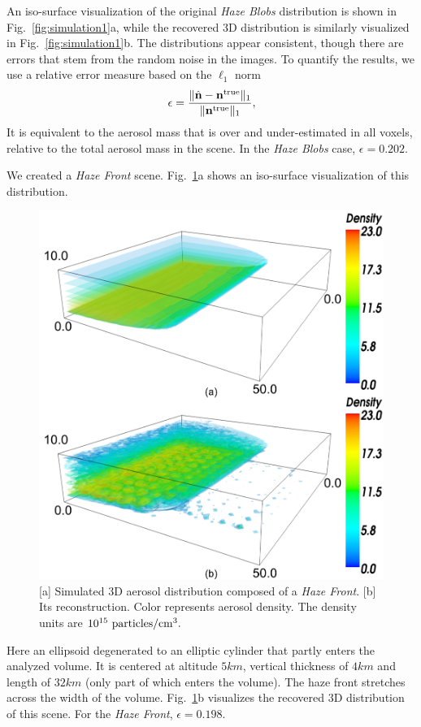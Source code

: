 \documentclass[10pt,twocolumn,letterpaper]{article}
\newcommand{\yoavcomment}[1]{}
\renewcommand{\yoavcomment}[1]{#1} %
\begin{document}
An iso-surface visualization of the original {\em Haze Blobs} distribution is shown in
Fig.~\ref{fig:simulation1}a, while the recovered 3D distribution is similarly visualized in
Fig.~\ref{fig:simulation1}b. The distributions appear consistent, though there are errors that stem from the random noise in the images. To quantify the results, we use a relative  error measure based on the $\ell_1$ norm
\begin{equation}
  \label{eq:ndiff}
  \epsilon=\frac{\| \hat{\bf n}  - {\bf n}^{\rm true} \|_1}
             {\| {\bf n}^{\rm true} \|_1} ,
  \hspace{-0.05cm}
\end{equation}
It is equivalent to the aerosol mass that is over and under-estimated in all voxels, relative to the total aerosol mass in the scene.
In the {\em Haze Blobs} case, $\epsilon=0.202$.

We created a {\em Haze Front} scene. Fig.~\ref{fig:simulation2}a shows an iso-surface visualization of this distribution.
\begin{figure}
  \centering
  \yoavcomment{\includegraphics[width=\columnwidth]{images/simulation2}}
  \caption{\small [a] Simulated 3D aerosol distribution composed of a {\em Haze Front}. [b] Its reconstruction. Color represents aerosol density. The density units are
  $10^{15}~{\rm particles}/{\rm cm}^3.$}
  \label{fig:simulation2}
\end{figure}
Here an ellipsoid degenerated to an elliptic cylinder that partly enters the analyzed volume. It is centered at altitude $5km$, vertical thickness of $4km$ and length of $32km$ (only part of which enters the volume). The haze front stretches across the width of the volume.  
Fig.~\ref{fig:simulation2}b visualizes the recovered 3D distribution of this scene. For the {\em Haze Front}, $\epsilon=0.198$.
\end{document}

